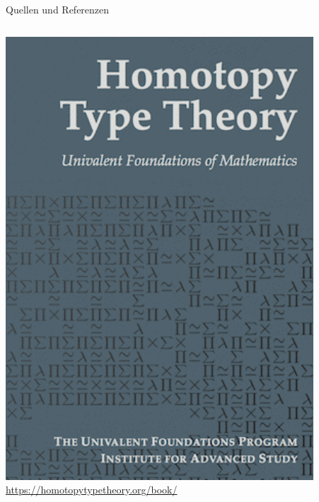 \documentclass[11pt,aspectratio=169,notheorems]{beamer}
\begin{document}
\begin{frame}{Quellen und Referenzen}
    \begin{columns}[T] %
        \begin{column}{.30\textwidth}
        \begin{center}
            \includegraphics[width=0.9\textwidth]{images/cover-web}
            \tiny{\href{https://homotopytypetheory.org/book/}{https://homotopytypetheory.org/book/}}
        \end{center}
        \end{column}%
        \hfill%
        \begin{column}{.30\textwidth}
        \begin{center}

\end{center}
\end{column}
\end{columns}
\end{frame}
\end{document}
